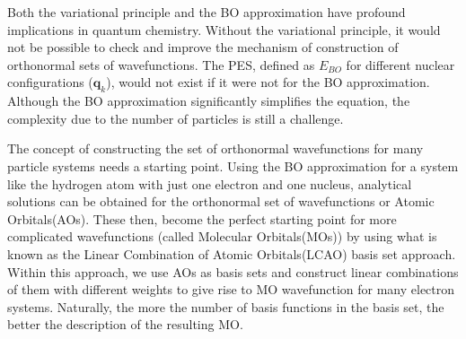            Both the variational principle and the BO approximation have profound implications in quantum chemistry. Without the variational principle, it would not be possible to check and improve the mechanism of construction of orthonormal sets of wavefunctions. The PES, defined as $E_{BO}$ for different nuclear configurations ($\mathbf{q}_k$), would not exist if it were not for the BO approximation. Although the BO approximation significantly simplifies the \Schrodinger{} equation, the complexity due to the number of particles is still a challenge.

            The concept of constructing the set of orthonormal wavefunctions for many particle systems needs a starting point. Using the BO approximation for a system like the hydrogen atom with just one electron and one nucleus, analytical solutions can be obtained for the orthonormal set of wavefunctions or Atomic Orbitals(AOs). These then, become the perfect starting point for more complicated wavefunctions (called Molecular Orbitals(MOs)) by using what is known as the Linear Combination of Atomic Orbitals(LCAO) basis set approach. Within this approach, we use AOs as basis sets and construct linear combinations of them with different weights to give rise to MO wavefunction for many electron systems. Naturally, the more the number of basis functions in the basis set, the better the description of the resulting MO.

